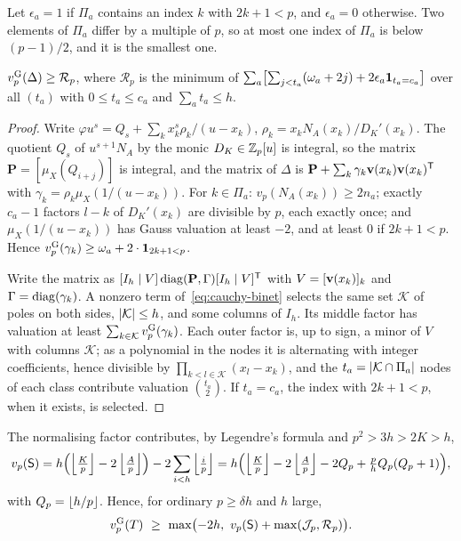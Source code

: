 Let $\epsilon_a=1$ if $\Pi_a$ contains an index $k$ with $2k+1<p$, and $\epsilon_a=0$
otherwise. Two elements of $\Pi_a$ differ by a multiple of $p$, so at most one index of $\Pi_a$
is below $(p-1)/2$, and it is the smallest one.

\begin{proposition}\label{prop:raw}
$v_{p}^{\mathrm{G}}(\Delta)\ge\mathcal R_p$, where $\mathcal R_p$ is the minimum of
$\sum_a\bigl[\sum_{j<t_a}(\omega_a+2j)+2\epsilon_a\mathbf{1}_{t_a=c_a}\bigr]$ over all $(t_a)$ with
$0\le t_a\le c_a$ and $\sum_at_a\le h$.
\end{proposition}

\begin{proof}
Write $\varphi u^s=Q_s+\sum_kx_k^s\rho_k/(u-x_k)$, $\rho_k=x_kN_A(x_k)/D_K'(x_k)$. The quotient
$Q_s$ of $u^{s+1}N_A$ by the monic $D_K\in\mathbb{Z}_p[u]$ is integral, so the matrix $\mathbf P=
[\mu_X(Q_{i+j})]$ is integral, and the matrix of $\Delta$ is
$\mathbf P+\sum_k\gamma_k\mathbf{v}(x_k)\mathbf{v}(x_k)^{\mathsf T}$ with
$\gamma_k=\rho_k\mu_X(1/(u-x_k))$. For $k\in\Pi_a$: $v_p(N_A(x_k))\ge2n_a$; exactly $c_a-1$
factors $l-k$ of $D_K'(x_k)$ are divisible by $p$, each exactly once; and $\mu_X(1/(u-x_k))$ has
Gauss valuation at least $-2$, and at least $0$ if $2k+1<p$. Hence
$v_{p}^{\mathrm{G}}(\gamma_k)\ge\omega_a+2\cdot\mathbf{1}_{2k+1<p}$.

Write the matrix as $[I_h\mid V]\operatorname{diag}(\mathbf P,\Gamma)[I_h\mid V]^{\mathsf T}$ with
$V=[\mathbf{v}(x_k)]_k$ and $\Gamma=\operatorname{diag}(\gamma_k)$. A nonzero term of~\eqref{eq:cauchy-binet}
selects the same set $\mathcal K$ of poles on both sides, $\left\lvert \mathcal K\right\rvert\le h$, and some columns of
$I_h$. Its middle factor has valuation at least $\sum_{k\in\mathcal K}v_{p}^{\mathrm{G}}(\gamma_k)$. Each outer
factor is, up to sign, a minor of $V$ with columns $\mathcal K$; as a polynomial in the nodes it is
alternating with integer coefficients, hence divisible by $\prod_{k<l\in\mathcal K}(x_l-x_k)$, and
the $t_a=\left\lvert \mathcal K\cap\Pi_a\right\rvert$ nodes of each class contribute valuation $\binom{t_a}{2}$. If
$t_a=c_a$, the index with $2k+1<p$, when it exists, is selected.
\end{proof}

The normalising factor contributes, by Legendre's formula and $p^2>3h>2K>h$,
\begin{equation}\label{eq:vp-S}
  v_p(\mathsf{S})=h\Bigl(\left\lfloor \tfrac Kp\right\rfloor-2\left\lfloor \tfrac Ap\right\rfloor\Bigr)-2\sum_{i<h}\left\lfloor \tfrac ip\right\rfloor
  =h\Bigl(\left\lfloor \tfrac Kp\right\rfloor-2\left\lfloor \tfrac Ap\right\rfloor-2Q_p+\tfrac phQ_p(Q_p+1)\Bigr),
\end{equation}
with $Q_p=\left\lfloor h/p\right\rfloor$. Hence, for ordinary $p\ge\delta h$ and $h$ large,
\begin{equation}\label{eq:vp-T-combined}
  v_{p}^{\mathrm{G}}(T)\ \ge\ \max\bigl(-2h,\ v_p(\mathsf{S})+\max(\mathcal J_p,\mathcal R_p)\bigr).
\end{equation}

